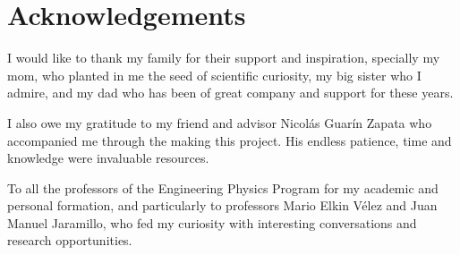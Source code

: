 \cleardoublepage {}
{}
\chapter*{Acknowledgements}

I would like to thank my family for their support and inspiration, specially my mom, who planted in me the seed of scientific curiosity, my big sister who I admire, and my dad who has been of great company and support for these years.

I also owe my gratitude to my friend and advisor Nicol\'as Guar\'in Zapata who accompanied me through the making this project. His endless patience, time and knowledge were invaluable resources.

To all the professors of the Engineering Physics Program for my academic and personal formation, and particularly to professors Mario Elkin V\'elez and Juan Manuel Jaramillo, who fed my curiosity with interesting conversations and research opportunities.